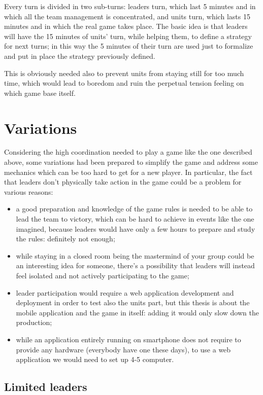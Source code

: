 			Every turn is divided in two sub-turns: leaders turn, which last 5 minutes and in which all the team management is concentrated, and units turn, which lasts 15 minutes and in which the real game takes place.
			The basic idea is that leaders will have the 15 minutes of units' turn, while helping them, to define a strategy for next turns; in this way the 5 minutes of their turn are used just to formalize and put in place the strategy previously defined.
			
			This is obviously needed also to prevent units from staying still for too much time, which would lead to boredom and ruin the perpetual tension feeling on which game base itself.
			
	\section{Variations}
		
		Considering the high coordination needed to play a game like the one described above, some variations had been prepared to simplify the game and address some mechanics which can be too hard to get for a new player.
		In particular, the fact that leaders don't physically take action in the game could be a problem for various reasons:
		
		\begin{itemize}
			\item a good preparation and knowledge of the game rules is needed to be able to lead the team to victory, which can be hard to achieve in events like the one imagined, because leaders would have only a few hours to prepare and study the rules: definitely not enough;
			\item while staying in a closed room being the mastermind of your group could be an interesting idea for someone, there's a possibility that leaders will instead feel isolated and not actively participating to the game;
			\item leader participation would require a web application development and deployment in order to test also the units part, but this thesis is about the mobile application and the game in itself: adding it would only slow down the production;
			\item while an application entirely running on smartphone does not require to provide any hardware (everybody have one these days), to use a web application we would need to set up 4-5 computer.
		\end{itemize}
		
		\subsection{Limited leaders}
		
